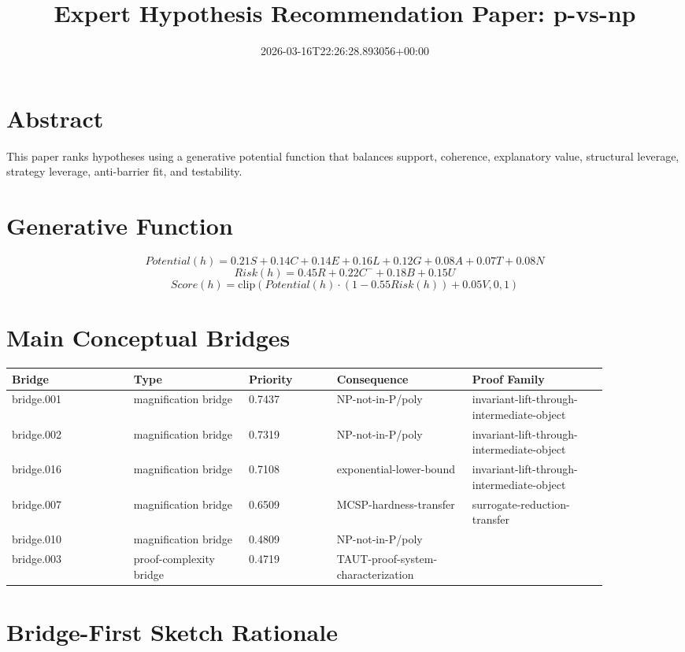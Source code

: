 \documentclass[11pt]{article}
\title{Expert Hypothesis Recommendation Paper: p-vs-np}
\date{2026-03-16T22:26:28.893056+00:00}
\begin{document}
\maketitle
\section*{Abstract}
This paper ranks hypotheses using a generative potential function that balances support, coherence, explanatory value, structural leverage, strategy leverage, anti-barrier fit, and testability.
\section*{Generative Function}
\[
Potential(h) = 0.21S + 0.14C + 0.14E + 0.16L + 0.12G + 0.08A + 0.07T + 0.08N
\]
\[
Risk(h) = 0.45R + 0.22C^- + 0.18B + 0.15U
\]
\[
Score(h) = \mathrm{clip}(Potential(h) \cdot (1 - 0.55 Risk(h)) + 0.05V, 0, 1)
\]
\section*{Main Conceptual Bridges}
\begin{longtable}{p{0.18\linewidth}p{0.17\linewidth}p{0.13\linewidth}p{0.20\linewidth}p{0.20\linewidth}}
\toprule
Bridge & Type & Priority & Consequence & Proof Family \\
\midrule
\endhead
bridge.001 & magnification bridge & 0.7437 & NP-not-in-P/poly & invariant-lift-through-intermediate-object \\
bridge.002 & magnification bridge & 0.7319 & NP-not-in-P/poly & invariant-lift-through-intermediate-object \\
bridge.016 & magnification bridge & 0.7108 & exponential-lower-bound & invariant-lift-through-intermediate-object \\
bridge.007 & magnification bridge & 0.6509 & MCSP-hardness-transfer & surrogate-reduction-transfer \\
bridge.010 & magnification bridge & 0.4809 & NP-not-in-P/poly &  \\
bridge.003 & proof-complexity bridge & 0.4719 & TAUT-proof-system-characterization &  \\
\bottomrule
\end{longtable}
\section*{Bridge-First Sketch Rationale}
\end{document}
